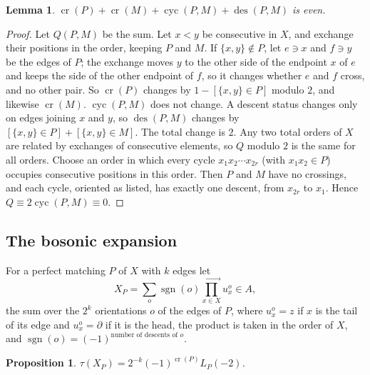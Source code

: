 \documentclass[11pt,a4paper,reqno]{amsart}
\newtheorem{proposition}[theorem]{Proposition}
\newtheorem{lemma}[theorem]{Lemma}
\theoremstyle{definition}
\newcommand{\cro}{\operatorname{cr}}
\newcommand{\cyc}{\operatorname{cyc}}
\newcommand{\des}{\operatorname{des}}
\newcommand{\dd}{\partial}
\begin{document}
\begin{lemma}\label{lem:sign}
$\cro(P)+\cro(M)+\cyc(P,M)+\des(P,M)$ is even.
\end{lemma}

\begin{proof}
Let $Q(P,M)$ be the sum. Let $x<y$ be consecutive in $X$, and exchange their positions in the order, keeping $P$ and $M$. If $\{x,y\}\notin P$, let $e\ni x$ and $f\ni y$ be the edges of $P$; the exchange moves $y$ to the other side of the endpoint $x$ of $e$ and keeps the side of the other endpoint of $f$, so it changes whether $e$ and $f$ cross, and no other pair. So $\cro(P)$ changes by $1-[\{x,y\}\in P]$ modulo $2$, and likewise $\cro(M)$. $\cyc(P,M)$ does not change. A descent status changes only on edges joining $x$ and $y$, so $\des(P,M)$ changes by $[\{x,y\}\in P]+[\{x,y\}\in M]$. The total change is $2$. Any two total orders of $X$ are related by exchanges of consecutive elements, so $Q$ modulo $2$ is the same for all orders. Choose an order in which every cycle $x_1x_2\cdots x_{2r}$ (with $x_1x_2\in P$) occupies consecutive positions in this order. Then $P$ and $M$ have no crossings, and each cycle, oriented as listed, has exactly one descent, from $x_{2r}$ to $x_1$. Hence $Q\equiv2\cyc(P,M)\equiv0$.
\end{proof}

\subsection{The bosonic expansion}
For a perfect matching $P$ of $X$ with $k$ edges let
\[
X_P=\sum_{o}\operatorname{sgn}(o)\prod_{x\in X}^{\longrightarrow}u^o_x\in A,
\]
the sum over the $2^k$ orientations $o$ of the edges of $P$, where $u^o_x=z$ if $x$ is the tail of its edge and $u^o_x=\dd$ if it is the head, the product is taken in the order of $X$, and $\operatorname{sgn}(o)=(-1)^{\text{number of descents of }o}$.

\begin{proposition}\label{prop:boson}
$\tau(X_P)=2^{-k}(-1)^{\cro(P)}L_P(-2)$.
\end{proposition}
\end{document}
